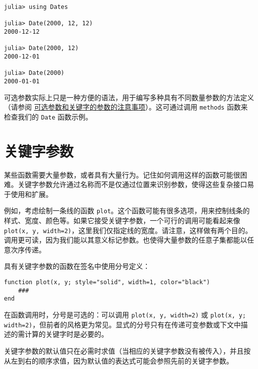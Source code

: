 \begin{verbatim}
julia> using Dates

julia> Date(2000, 12, 12)
2000-12-12

julia> Date(2000, 12)
2000-12-01

julia> Date(2000)
2000-01-01
\end{verbatim}



可选参数实际上只是一种方便的语法，用于编写多种具有不同数量参数的方法定义（请参阅 \hyperlink{15680937628543940678}{可选参数和关键字的参数的注意事项}）。这可通过调用 \texttt{methods} 函数来检查我们的 \texttt{Date} 函数示例。



\hypertarget{8084690442149965313}{}


\section{关键字参数}



某些函数需要大量参数，或者具有大量行为。记住如何调用这样的函数可能很困难。关键字参数允许通过名称而不是仅通过位置来识别参数，使得这些复杂接口易于使用和扩展。



例如，考虑绘制一条线的函数 \texttt{plot}。这个函数可能有很多选项，用来控制线条的样式、宽度、颜色等。如果它接受关键字参数，一个可行的调用可能看起来像 \texttt{plot(x, y, width=2)}，这里我们仅指定线的宽度。请注意，这样做有两个目的。调用更可读，因为我们能以其意义标记参数。也使得大量参数的任意子集都能以任意次序传递。



具有关键字参数的函数在签名中使用分号定义：




\begin{verbatim}
function plot(x, y; style="solid", width=1, color="black")
    ###
end
\end{verbatim}



在函数调用时，分号是可选的：可以调用 \texttt{plot(x, y, width=2)} 或 \texttt{plot(x, y; width=2)}，但前者的风格更为常见。显式的分号只有在传递可变参数或下文中描述的需计算的关键字时是必要的。



关键字参数的默认值只在必需时求值（当相应的关键字参数没有被传入），并且按从左到右的顺序求值，因为默认值的表达式可能会参照先前的关键字参数。



